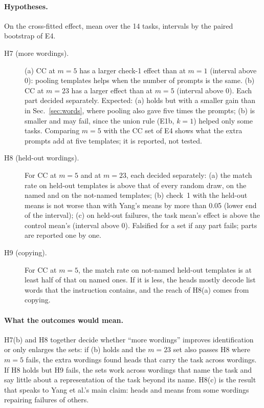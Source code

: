 \documentclass[11pt,a4paper]{article}
\begin{document}
\paragraph{Hypotheses.} On the cross-fitted effect, mean over the 14 tasks, intervals by the
paired bootstrap of E4.
\begin{description}
  \item[H7 (more wordings).] (a) CC at $m = 5$ has a larger check-1 effect than at $m = 1$
    (interval above 0): pooling templates helps when the number of prompts is the same.
    (b) CC at $m = 23$ has a larger effect than at $m = 5$ (interval above 0). Each part decided
    separately. Expected: (a) holds but with a smaller gain than in Sec.~\ref{sec:words}, where pooling also
    gave five times the prompts; (b) is smaller and may fail, since the union rule (E1b, $k = 1$)
    helped only some tasks. Comparing $m = 5$ with the CC set of E4 shows what the extra prompts
    add at five templates; it is reported, not tested.
  \item[H8 (held-out wordings).] For CC at $m = 5$ and at $m = 23$, each decided separately:
    (a) the match rate on held-out templates is above that of every random draw, on the named
    and on the not-named templates; (b) check~1 with the held-out means is not worse than with
    Yang's means by more than 0.05 (lower end of the interval); (c) on held-out failures, the
    task mean's effect is above the control mean's (interval above 0). Falsified for a set if
    any part fails; parts are reported one by one.
  \item[H9 (copying).] For CC at $m = 5$, the match rate on not-named held-out templates is
    at least half of that on named ones. If it is less, the heads mostly decode list words
    that the instruction contains, and the reach of H8(a) comes from copying.
\end{description}

\paragraph{What the outcomes would mean.} H7(b) and H8 together decide whether ``more
wordings'' improves identification or only enlarges the sets: if (b) holds and the $m = 23$ set
also passes H8 where $m = 5$ fails, the extra wordings found heads that carry the task across
wordings. If H8 holds but H9 fails, the sets work across wordings that name the task and say
little about a representation of the task beyond its name. H8(c) is the result that speaks to
Yang et al.'s main claim: heads and means from some wordings repairing failures of others.
\end{document}
